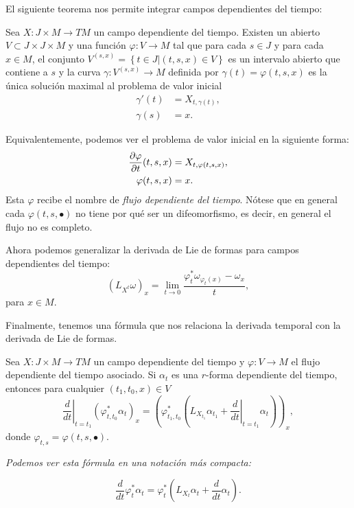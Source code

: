   El siguiente teorema nos permite integrar campos dependientes del tiempo:
  \begin{thm}
    Sea $X:J\times M \rightarrow TM$ un campo dependiente del tiempo. Existen un abierto $V\subset J\times J\times M$ y una función $\varphi:V\rightarrow M$ tal que para cada $s\in J$ y para cada $x\in M$, el conjunto $V^{(s,x)}=\left\{ t\in J | (t,s,x) \in V \right\}$ es un intervalo abierto que contiene a $s$ y la curva $\gamma:V^{(s,x)}\rightarrow M$ definida por $\gamma(t)=\varphi(t,s,x)$ es la única solución maximal al problema de valor inicial
    \begin{align*}
      \gamma'(t)&=X_{t,\gamma(t)}, \\
      \gamma(s)&=x.
    \end{align*}
  \end{thm}
    Equivalentemente, podemos ver el problema de valor inicial en la siguiente forma:
    \begin{align*}
      \frac{\partial \varphi}{\partial t}(t,s,x)&=X_{t,\varphi(t,s,x)}, \\
      \varphi(t,s,x)&=x.
    \end{align*}
    Esta $\varphi$ recibe el nombre de \emph{flujo dependiente del tiempo}. Nótese que en general cada $\varphi(t,s,\bullet)$ no tiene por qué ser un difeomorfismo, es decir, en general el flujo no es completo.

  Ahora podemos generalizar la derivada de Lie de formas para campos dependientes del tiempo:
  \begin{equation*}
    (L_{X^t}\omega)_x=\lim_{t\rightarrow 0}\frac{\varphi^*_t \omega_{\varphi_t(x)} - \omega_x}{t},
  \end{equation*}
  para $x\in M$.
  
  Finalmente, tenemos una fórmula que nos relaciona la derivada temporal con la derivada de Lie de formas.
  \begin{prop}
    Sea $ X:J\times M \rightarrow TM $ un campo dependiente del tiempo y $ \varphi:V\rightarrow M $ el flujo dependiente del tiempo asociado. Si $\alpha_t$ es una $r$-forma dependiente del tiempo, entonces para cualquier $(t_1,t_0,x)\in V$ 
   \begin{equation*}
     \left.\frac{d}{dt}\right\lvert _{t=t_1}\left(\varphi^*_{t,t_0} \alpha_t\right)_x = \left(\varphi^*_{t_1,t_0} \left( L_{X_{t_1}}\alpha_{t_1} + \left.\frac{d}{dt}\right\lvert_{t=t_1}\alpha_t\right) \right)_x,
   \end{equation*}
   donde $\varphi_{t,s}=\varphi(t,s,\bullet)$. 
\end{prop}
\begin{obs}
  \em
   Podemos ver esta fórmula en una notación más compacta:

    \begin{equation*}
      \frac{d}{dt}\varphi^*_t \alpha_t = \varphi^*_t \left( L_{X_t}\alpha_t + \frac{d}{dt}\alpha_t \right).
    \end{equation*}
  \end{obs}

